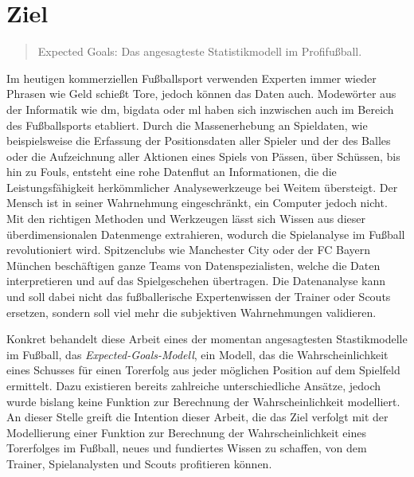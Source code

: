 \section{Ziel}

\begin{quote} 
\glqq Expected Goals: Das angesagteste Statistikmodell im Profifußball.\grqq{}
\end{quote}

Im heutigen kommerziellen Fußballsport verwenden Experten immer wieder Phrasen wie \glqq Geld schießt Tore\grqq, jedoch können das Daten auch. Modewörter aus der Informatik wie \gls{dm}, \gls{bigdata} oder \gls{ml} haben sich inzwischen auch im Bereich des Fußballsports etabliert. Durch die Massenerhebung an Spieldaten, wie beispielsweise die Erfassung der Positionsdaten aller Spieler und der des Balles oder die Aufzeichnung aller Aktionen eines Spiels von Pässen, über Schüssen, bis hin zu Fouls, entsteht eine rohe Datenflut an Informationen, die die Leistungsfähigkeit herkömmlicher Analysewerkzeuge bei Weitem übersteigt. Der Mensch ist in seiner Wahrnehmung eingeschränkt, ein Computer jedoch nicht. Mit den richtigen Methoden und Werkzeugen lässt sich Wissen aus dieser überdimensionalen Datenmenge extrahieren, wodurch die Spielanalyse im Fußball revolutioniert wird. Spitzenclubs wie Manchester City oder der FC Bayern München beschäftigen ganze Teams von Datenspezialisten, welche die Daten interpretieren und auf das Spielgeschehen übertragen. Die Datenanalyse kann und soll dabei nicht das fußballerische Expertenwissen der Trainer oder Scouts ersetzen, sondern soll viel mehr die subjektiven Wahrnehmungen validieren. 

Konkret behandelt diese Arbeit eines der momentan angesagtesten Stastikmodelle im Fußball, das \textit{Expected-Goals-Modell}, ein Modell, das die Wahrscheinlichkeit eines Schusses für einen Torerfolg aus jeder möglichen Position auf dem Spielfeld ermittelt. Dazu existieren bereits zahlreiche unterschiedliche Ansätze, jedoch wurde bislang keine Funktion zur Berechnung der Wahrscheinlichkeit modelliert. An dieser Stelle greift die Intention dieser Arbeit, die das Ziel verfolgt mit der Modellierung einer Funktion zur Berechnung der Wahrscheinlichkeit eines Torerfolges im Fußball, neues und fundiertes Wissen zu schaffen, von dem Trainer, Spielanalysten und Scouts profitieren können. 
	